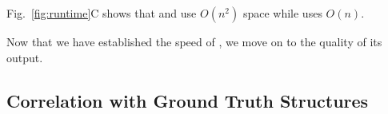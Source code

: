 Fig.~\ref{fig:runtime}C
shows that  \rnafold and \contrafold use $O(n^2)$ space
while \linearpartition uses $O(n)$.







Now that we have established the speed of  \linearpartition,
we move on to the quality of its output.

\vspace{-.1cm}
\subsection{Correlation with Ground Truth Structures}
\label{sec:corr}




